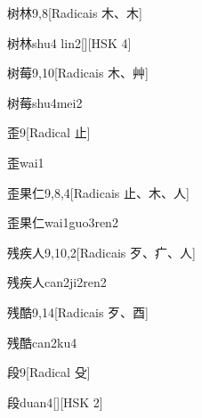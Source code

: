 \begin{entry}{树林}{9,8}[Radicais ⽊、⽊]
  \begin{phonetics}{树林}{shu4 lin2}[][HSK 4]
  \end{phonetics}
\end{entry}

\begin{entry}{树莓}{9,10}[Radicais ⽊、⾋]
  \begin{phonetics}{树莓}{shu4mei2}
  \end{phonetics}
\end{entry}

\begin{entry}{歪}{9}[Radical ⽌]
  \begin{phonetics}{歪}{wai1}
  \end{phonetics}
\end{entry}

\begin{entry}{歪果仁}{9,8,4}[Radicais ⽌、⽊、⼈]
  \begin{phonetics}{歪果仁}{wai1guo3ren2}
  \end{phonetics}
\end{entry}

\begin{entry}{残疾人}{9,10,2}[Radicais ⽍、⽧、⼈]
  \begin{phonetics}{残疾人}{can2ji2ren2}
  \end{phonetics}
\end{entry}

\begin{entry}{残酷}{9,14}[Radicais ⽍、⾣]
  \begin{phonetics}{残酷}{can2ku4}
  \end{phonetics}
\end{entry}

\begin{entry}{段}{9}[Radical ⽎]
  \begin{phonetics}{段}{duan4}[][HSK 2]
  \end{phonetics}
\end{entry}

